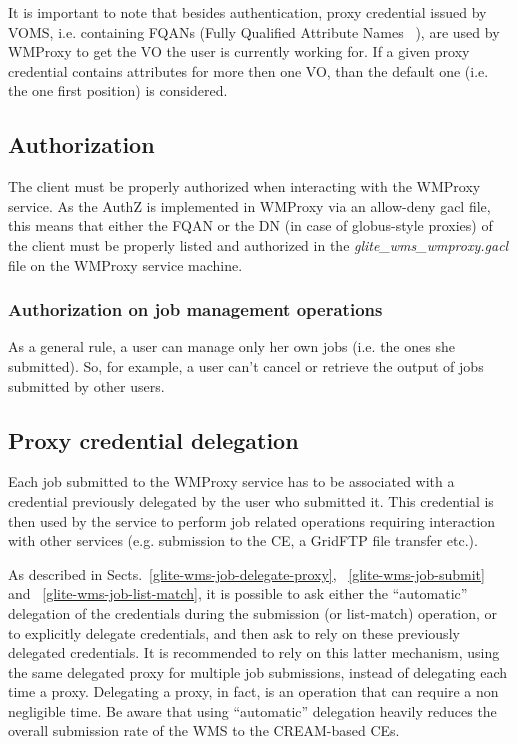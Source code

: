 It is important to note that besides authentication, proxy credential issued by VOMS, i.e. containing 
FQANs (Fully Qualified Attribute Names ~\cite{voms-core}), are used by WMProxy to get the VO the user is currently working for. 
If a given proxy credential contains attributes for more then one VO, than the default one (i.e. the one first 
position) is considered.   


\subsection{Authorization}
The client must be properly authorized when interacting with the WMProxy service.
As the AuthZ is implemented in WMProxy via an allow-deny gacl file, 
this means that either the FQAN or the DN (in case of globus-style proxies) of the
client must be properly listed and authorized in the \emph{glite\_wms\_wmproxy.gacl} file 
on the WMProxy service machine. 


\subsubsection{Authorization on job management operations}
\label{jobauthz}

As a general rule, a user can manage only her own jobs (i.e. the ones
she submitted). So, for example, a user can't cancel or retrieve the output
of jobs submitted by other users.

\subsection{Proxy credential delegation}

Each job submitted to the WMProxy service has to be associated with a credential previously delegated 
by the user who submitted it. This credential is then used by the service to perform job related 
operations requiring interaction with other services (e.g. submission to the CE, a GridFTP 
file transfer etc.).  


As described in Sects.~\ref{glite-wms-job-delegate-proxy}, ~\ref{glite-wms-job-submit} and 
~\ref{glite-wms-job-list-match}, it is possible to ask either the ``automatic'' delegation 
of the credentials during the submission (or list-match) operation, or to explicitly 
delegate credentials, and then ask to rely on these previously delegated credentials.
It is recommended to rely on this latter mechanism, using the same delegated proxy for multiple 
job submissions, instead of delegating each time a proxy.
Delegating a proxy, in fact, is an operation that can require a non negligible
time. Be aware that using ``automatic'' delegation heavily reduces the overall submission rate of the WMS to the CREAM-based CEs.
